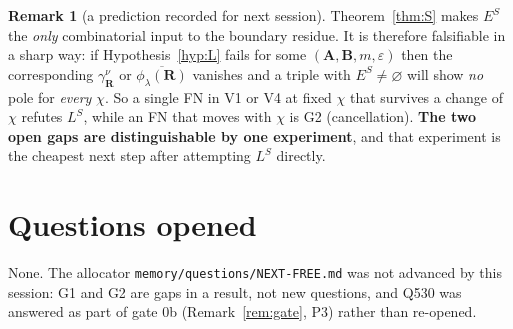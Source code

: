 \documentclass[11pt]{article}
\theoremstyle{definition}
\newtheorem{rem}[thm]{Remark}
\newcommand{\bA}{\mathbf{A}}
\newcommand{\bB}{\mathbf{B}}
\newcommand{\bR}{\mathbf{R}}
\newcommand{\ES}{E^{S}}
\begin{document}
\begin{rem}[a prediction recorded for next session]
Theorem~\ref{thm:S} makes $\ES$ the \emph{only} combinatorial input to the
boundary residue.  It is therefore falsifiable in a sharp way: if
Hypothesis~\ref{hyp:L} fails for some $(\bA,\bB,m,\varepsilon)$ then the
corresponding $\gamma^{\nu}_{\bR}$ or $\overline{\phi_\lambda(\bR)}$ vanishes and
a triple with $\ES\ne\varnothing$ will show \emph{no} pole for \emph{every}
$\chi$.  So a single FN in V1 or V4 at fixed $\chi$ that survives a change of
$\chi$ refutes $L^{S}$, while an FN that moves with $\chi$ is G2 (cancellation).
\textbf{The two open gaps are distinguishable by one experiment}, and that
experiment is the cheapest next step after attempting $L^{S}$ directly.
\end{rem}

\section*{Questions opened}

None.  The allocator \texttt{memory/questions/NEXT-FREE.md} was not advanced by
this session: G1 and G2 are gaps in a result, not new questions, and
Q530 was answered as part of gate 0b (Remark~\ref{rem:gate}, P3) rather than
re-opened.
\end{document}
